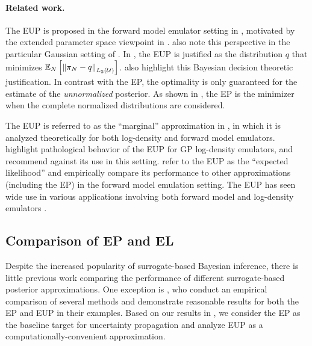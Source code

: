 \documentclass[12pt]{article}
\begin{document}
\paragraph{Related work.} The EUP is proposed in the forward model emulator setting 
in \citet{BilionisBayesSurrogates}, motivated by the extended parameter space viewpoint
in . \citet{StuartTeck2,CES} also note this perspective
in the particular Gaussian setting of .
In \citet{SinsbeckNowak}, the EUP is justified as the distribution 
$q$ that minimizes $\mathbb{E}_{N}\left[\left\lVert\pi_{N} - q\right\rVert_{L_2(\mathcal{U})} \right]$.
\citet{StuartTeck1,StuartTeck2,VehtariParallelGP} also highlight this Bayesian 
decision theoretic justification. 
In contrast with the EP, the optimality is only guaranteed for the estimate of the 
\textit{unnormalized} posterior.
As shown in , the EP is the minimizer when the complete 
normalized distributions are considered.

The EUP is referred to as the ``marginal'' approximation in 
\citet{StuartTeck1,StuartTeck2,random_fwd_models,TeckHyperpar},
in which it is analyzed theoretically for both log-density and forward 
model emulators. \citet{VehtariParallelGP} highlight pathological 
behavior of the EUP for GP log-density emulators, and recommend 
against its use in this setting. \citet{BurknerSurrogate} refer to 
the EUP as the ``expected likelihood'' and empirically compare its 
performance to other approximations (including the EP) in the 
forward model emulation setting. The EUP has seen wide 
use in various applications involving both forward model 
and log-density emulators 
\citep{weightedIVAR,GP_PDE_priors,CES,idealizedGCM,
villani2024posteriorsamplingadaptivegaussian,hydrologicalModel,hydrologicalModel2}.

\subsection{Comparison of EP and EL}
Despite the increased popularity of surrogate-based Bayesian inference, there is 
little previous work comparing the performance of different surrogate-based 
posterior approximations. One exception is \citet{BurknerSurrogate}, who conduct an 
empirical comparison of several methods and demonstrate reasonable results for 
both the EP and EUP in their examples. Based on our results in , 
we consider the EP as the baseline target for uncertainty propagation and analyze 
EUP as a computationally-convenient approximation. 
\end{document}

